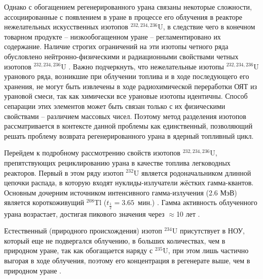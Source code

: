 Однако с обогащением регенерированного урана связаны некоторые сложности, ассоциированные с появлением в уране в процессе его облучения в реакторе нежелательных искусственных изотопов $^{232,234,236}$U, в следствие чего в конечном товарном продукте -- низкообогащенном уране -- регламентировано их содержание.
Наличие строгих ограничений на эти изотопы четного ряда обусловлено нейтронно-физическими и радиационными свойствами четных изотопов $^{232,234,236}$U \cite{smirnovEvolutionIsotopicComposition2012, proselkovAnalizVozmozhnostiIspolzovaniya2003, dudnikovInfluence236UEfficacy2016}.
Важно подчеркнуть, что нежелательные изотопы $^{232,234,236}$U уранового ряда, возникшие при облучении топлива и в ходе последующего его хранения, не могут быть извлечены в ходе радиохимической переработки ОЯТ из урановой смеси, так как химически все урановые изотопы идентичны. Способ сепарации этих элементов может быть связан только с их физическими свойствами -- различием массовых чисел. Поэтому метод разделения изотопов рассматривается в контексте данной проблемы как единственный, позволяющий решать проблему возврата регенерированного урана в ядерный топливный цикл. 

Перейдем к подробному рассмотрению свойств изотопов $^{232,234,236}$U, препятствующих рециклированию урана в качестве топлива легководных реакторов.
Первый в этом ряду изотоп $^{232}$U является родоначальником длинной цепочки распада, в которую входят нуклиды-излучатели жёстких гамма-квантов.
Основным дочерним источником интенсивного гамма-излучения (2.6 МэВ) является короткоживущий $^{208}$Tl ($t_{\frac{1}{2}}=3.65$ мин.) \cite{matveevUran232EgoVliyanie1985,abbasProliferationResistanceFeatures2013}. Гамма активность облученного урана возрастает, достигая пикового значения через $\approx$10 лет \cite{gresleyEnrichingRecyclingUranium1988}.

Естественный (природного происхождения) изотоп $^{234}$U присутствует в НОУ, который еще не подвергался облучению, в больших количествах, чем в природном уране, так как обогащается наряду с $^{235}$U, при этом лишь частично выгорая в ходе облучения, поэтому его концентрация в регенерате выше, чем в природном уране \cite{gresleyEnrichingRecyclingUranium1988}.

